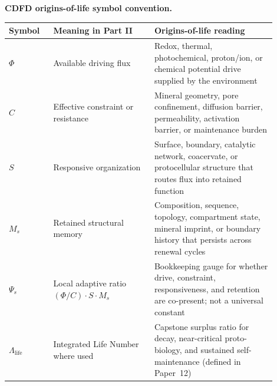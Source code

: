 \documentclass[11pt,a4paper]{article}
\begin{document}
\noindent\textbf{CDFD origins-of-life symbol convention.}
\begin{center}
{\small
\begin{tabular}{p{0.15\linewidth}p{0.34\linewidth}p{0.41\linewidth}}
\toprule
Symbol & Meaning in Part II & Origins-of-life reading \\
\midrule
$\Phi$ & Available driving flux & Redox, thermal, photochemical, proton/ion, or chemical potential drive supplied by the environment \\
$C$ & Effective constraint or resistance & Mineral geometry, pore confinement, diffusion barrier, permeability, activation barrier, or maintenance burden \\
$S$ & Responsive organization & Surface, boundary, catalytic network, coacervate, or protocellular structure that routes flux into retained function \\
$M_s$ & Retained structural memory & Composition, sequence, topology, compartment state, mineral imprint, or boundary history that persists across renewal cycles \\
$\Psi_s$ & Local adaptive ratio $(\Phi/C)\cdot S\cdot M_s$ & Bookkeeping gauge for whether drive, constraint, responsiveness, and retention are co-present; not a universal constant \\
$\Lambda_{\mathrm{life}}$ & Integrated Life Number where used & Capstone surplus ratio for decay, near-critical proto-biology, and sustained self-maintenance (defined in Paper~12) \\
\bottomrule
\end{tabular}
}
\end{center}
\end{document}
